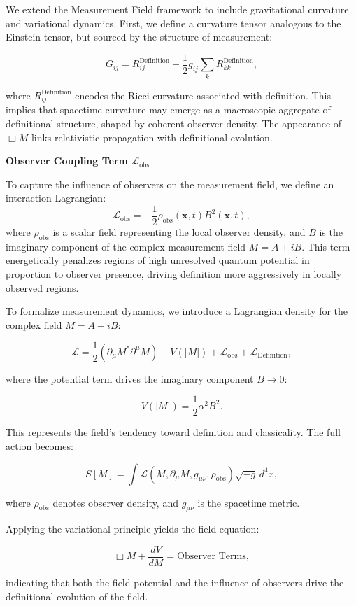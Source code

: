 We extend the Measurement Field framework to include gravitational curvature and variational dynamics. First, we define a curvature tensor analogous to the Einstein tensor, but sourced by the structure of measurement:

\[
G_{ij} = R_{ij}^{\text{Definition}} - \frac{1}{2} g_{ij} \sum_k R_{kk}^{\text{Definition}},
\]

where \(R_{ij}^{\text{Definition}}\) encodes the Ricci curvature associated with definition. This implies that spacetime curvature may emerge as a macroscopic aggregate of definitional structure, shaped by coherent observer density. The appearance of \(\Box M\) links relativistic propagation with definitional evolution.


\textbf{Observer Coupling Term \(\mathcal{L}_{\text{obs}}\)}

To capture the influence of observers on the measurement field, we define an interaction Lagrangian:
\[
\mathcal{L}_{\text{obs}} = - \frac{1}{2} \rho_{\text{obs}}(\mathbf{x},t) B^2(\mathbf{x},t),
\]
where \(\rho_{\text{obs}}\) is a scalar field representing the local observer density, and \(B\) is the imaginary component of the complex measurement field \(M = A + iB\). This term energetically penalizes regions of high unresolved quantum potential in proportion to observer presence, driving definition more aggressively in locally observed regions.

To formalize measurement dynamics, we introduce a Lagrangian density for the complex field \(M = A + iB\):

\[
\mathcal{L} = \frac{1}{2}(\partial_\mu M^* \partial^\mu M) - V(|M|) + \mathcal{L}_{\text{obs}} + \mathcal{L}_{\text{Definition}},
\]


where the potential term drives the imaginary component \(B \to 0\):

\[
V(|M|) = \frac{1}{2} \alpha^2 B^2.
\]

This represents the field's tendency toward definition and classicality. The full action becomes:

\[
S[M] = \int \mathcal{L}(M, \partial_\mu M, g_{\mu\nu}, \rho_{\text{obs}}) \sqrt{-g}\, d^4x,
\]

where \(\rho_{\text{obs}}\) denotes observer density, and \(g_{\mu\nu}\) is the spacetime metric.

Applying the variational principle yields the field equation:

\[
\Box M + \frac{dV}{dM} = \text{Observer Terms},
\]

indicating that both the field potential and the influence of observers drive the definitional evolution of the field.

